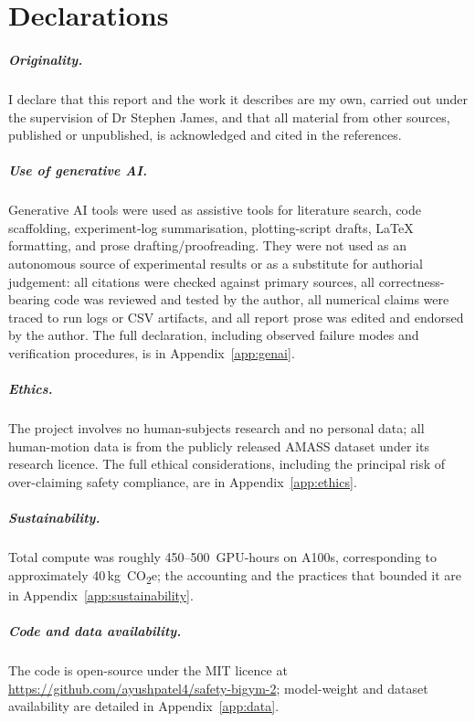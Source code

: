 \documentclass[11pt,a4paper]{report}
\begin{document}
\chapter*{Declarations}

\paragraph{Originality.}
I declare that this report and the work it describes are my own,
carried out under the supervision of Dr Stephen James, and that all
material from other sources, published or unpublished, is
acknowledged and cited in the references.

\paragraph{Use of generative AI.}
Generative AI tools were used as assistive tools for literature search,
code scaffolding, experiment-log summarisation, plotting-script drafts,
\LaTeX{} formatting, and prose drafting/proofreading. They were not
used as an autonomous source of experimental results or as a substitute
for authorial judgement: all citations were checked against primary
sources, all correctness-bearing code was reviewed and tested by the
author, all numerical claims were traced to run logs or CSV artifacts,
and all report prose was edited and endorsed by the author. The full
declaration, including observed failure modes and verification
procedures, is in Appendix~\ref{app:genai}.

\paragraph{Ethics.}
The project involves no human-subjects research and no personal
data; all human-motion data is from the publicly released AMASS
dataset under its research licence. The full ethical considerations,
including the principal risk of over-claiming safety compliance, are
in Appendix~\ref{app:ethics}.

\paragraph{Sustainability.}
Total compute was roughly 450--500~GPU-hours on A100s,
corresponding to approximately 40\,kg~CO\textsubscript{2}e; the
accounting and the practices that bounded it are in
Appendix~\ref{app:sustainability}.

\paragraph{Code and data availability.}
The code is open-source under the MIT licence at
\url{https://github.com/ayushpatel4/safety-bigym-2}; model-weight and
dataset availability are detailed in Appendix~\ref{app:data}.
\end{document}
